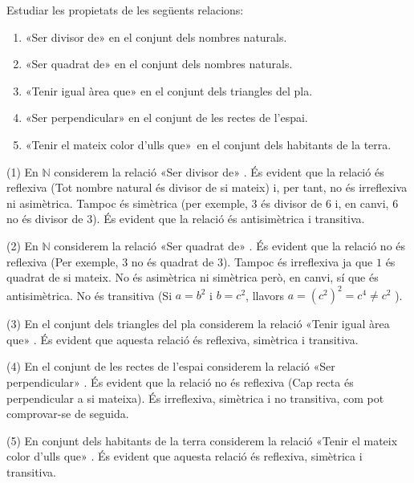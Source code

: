 \begin{exercici}
Estudiar les propietats de les següents relacions:

\begin{enumerate}
\item «Ser divisor de» en el conjunt dels
nombres naturals.

\item «Ser quadrat de» en el conjunt dels
nombres naturals.

\item «Tenir igual àrea que» en el
conjunt dels triangles del pla.

\item «Ser perpendicular» en el conjunt
de les rectes de l'espai.

\item «Tenir el mateix color d'ulls que»\
en el conjunt dels habitants de la terra.
\end{enumerate}
\end{exercici}

\begin{solucio}
(1) En $\mathbb{N}$ considerem la relació «Ser divisor
de» . És evident que la relació és reflexiva
(Tot nombre natural és divisor de si mateix) i, per tant, no és
irreflexiva ni asimètrica. Tampoc és simètrica (per exemple, $3$
és divisor de $6$ i, en canvi, $6$ no és divisor de $3$). És
evident que la relació és antisimètrica i transitiva.

(2) En $\mathbb{N}$ considerem la relació «Ser quadrat
de» . És evident que la relació no és reflexiva
(Per exemple, $3$ no és quadrat de $3$). Tampoc és irreflexiva ja
que $1$ és quadrat de si mateix. No és asimètrica ni simètrica però, en canvi, sí que és antisimètrica. No és
transitiva (Si $a=b^{2}$ i $b=c^{2}$, llavors $a=(c^{2})^{2}=c^{4}\neq c^{2}$%
).

(3) En el conjunt dels triangles del pla considerem la relació
«Tenir igual àrea que» . És
evident que aquesta relació és reflexiva, simètrica i transitiva.

(4) En el conjunt de les rectes de l'espai considerem la relació
«Ser perpendicular» . És evident que
la relació no és reflexiva (Cap recta és perpendicular a si
mateixa). És irreflexiva, simètrica i no transitiva, com pot
comprovar-se de seguida.

(5) En conjunt dels habitants de la terra considerem la relació
«Tenir el mateix color d'ulls que» . És evident que aquesta relació és reflexiva, simètrica i
transitiva.
\end{solucio}

